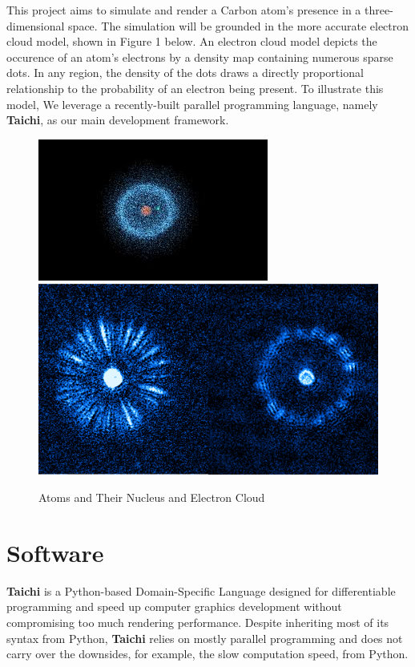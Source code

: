 \documentclass[acmtog]{acmart}
\begin{document}
This project aims to simulate and render a Carbon atom's presence in a three-dimensional space. The simulation will be grounded in the more accurate electron cloud model, shown in Figure 1 below. An electron cloud model depicts the occurence of an atom's electrons by a density map containing numerous sparse dots. In any region, the density of the dots draws a directly proportional relationship to the probability of an electron being present. To illustrate this model, We leverage a recently-built parallel programming language, namely \textbf{Taichi}, as our main development framework.

\begin{figure}[h]
  \centering
  \includegraphics[width=\linewidth]{./concept_1.jpeg}
  \includegraphics[width=\linewidth]{./concept_2.png}
  \caption{Atoms and Their Nucleus and Electron Cloud}
\end{figure}

\section{Software}
\textbf{Taichi} is a Python-based Domain-Specific Language designed for differentiable programming and speed up computer graphics development without compromising too much rendering performance. Despite inheriting most of its syntax from Python, \textbf{Taichi} relies on mostly parallel programming and does not carry over the downsides, for example, the slow computation speed, from Python.
\end{document}
